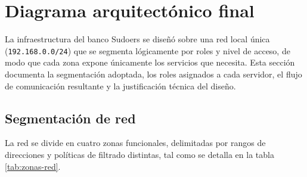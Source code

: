 
\section{Diagrama arquitectónico final}

La infraestructura del banco Sudoers se diseñó sobre una red local única
(\texttt{192.168.0.0/24}) que se segmenta l\'ogicamente por roles y nivel de
acceso, de modo que cada zona expone \'unicamente los servicios que
necesita. Esta secci\'on documenta la segmentaci\'on adoptada, los roles
asignados a cada servidor, el flujo de comunicaci\'on resultante y la
justificaci\'on t\'ecnica del dise\~no.

\subsection{Segmentaci\'on de red}

La red se divide en cuatro zonas funcionales, delimitadas por rangos de
direcciones y pol\'iticas de filtrado distintas, tal como se detalla en la
tabla \ref{tab:zonas-red}.

\begin{table}[H]
\centering
\caption{Segmentaci\'on de la red local por zonas funcionales}
\label{tab:zonas-red}
\end{table}


